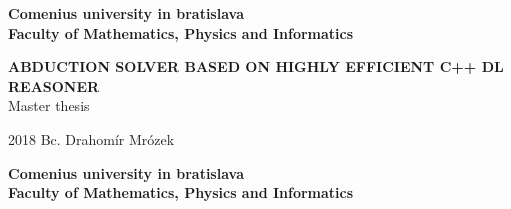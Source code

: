 \documentclass[12pt, a4paper, oneside]{book}
\newcommand\mftitle{Abduction solver based on  highly   efficient C++ DL reasoner}
\newcommand\mfthesistype{Master thesis}
\newcommand\mfauthor{Bc. Drahomír Mrózek}
\newcommand\mfuniversity{Comenius university in bratislava}
\newcommand\mffaculty{Faculty of Mathematics, Physics and Informatics}
\begin{document}
\frontmatter

\thispagestyle{empty}

\noindent
\begin{minipage}{\textwidth}
\begin{center}
\textbf{\mfuniversity \\
\mffaculty}
\end{center}
\end{minipage}

\vfill
\begin{figure}[!hbt]
	\begin{center}

		\label{img:logo}
	\end{center}
\end{figure}
\begin{center}

		{\textbf{\Large\MakeUppercase{\mftitle}}}\\
		\smallskip
		{\mfthesistype}
	
\end{center}
\vfill
2018 \hfill
\mfauthor
\eject 

\thispagestyle{empty}

\noindent
\begin{minipage}{\textwidth}
\begin{center}
\textbf{\mfuniversity \\
\mffaculty}
\end{center}
\end{minipage}
\end{document}
